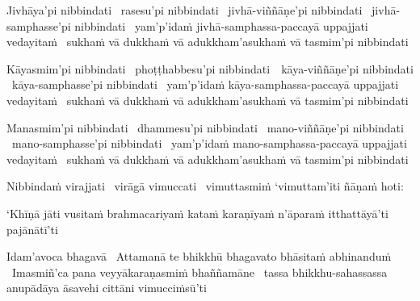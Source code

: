 \ifbfive\clearpage\fi

\begin{pali-hang}
  Jivhāya'pi nibbindati \breathmark\ rasesu'pi nibbindati \breathmark\ jivhā-viññāṇe'pi nibbindati \breathmark\ jivhā-samphasse'pi nibbindati \breathmark\ yam'p'idaṁ jivhā-samphassa-paccayā uppajjati vedayitaṁ \breathmark\ sukhaṁ vā dukkhaṁ vā adukkham'asukhaṁ vā tasmim'pi nibbindati
\end{pali-hang}

\ifafive\clearpage\fi

\begin{pali-hang}
  Kāyasmim'pi nibbindati \breathmark\ phoṭṭhabbesu'pi \mbox{nibbindati}~\breathmark\ kāya-viññāṇe'pi nibbindati \breathmark\ kāya-samphasse'pi nibbindati \breathmark\ yam'p'idaṁ kāya-samphassa-paccayā uppajjati vedayitaṁ \breathmark\ sukhaṁ vā dukkhaṁ vā adukkham'asukhaṁ vā tasmim'pi nibbindati
\end{pali-hang}

\begin{pali-hang}
  Manasmim'pi nibbindati \breathmark\ dhammesu'pi nibbindati \breathmark\ mano-viññāṇe'pi nibbindati \breathmark\ mano-samphasse'pi nibbindati \breathmark\ yam'p'idaṁ mano-samphassa-paccayā uppajjati vedayitaṁ \breathmark\ sukhaṁ vā dukkhaṁ vā adukkham'asukhaṁ vā tasmim'pi nibbindati
\end{pali-hang}

\begin{pali-hang}
  Nibbindaṁ virajjati \breathmark\ virāgā vimuccati \breathmark\ vimuttasmiṁ `vimuttam'iti ñāṇaṁ hoti:
\end{pali-hang}

\begin{pali-hang}
  `Khīṇā jāti vusitaṁ brahmacariyaṁ kataṁ karaṇīyaṁ n'āparaṁ itthattāyā'ti pajānātī'ti
\end{pali-hang}

\begin{pali-hang}
  Idam'avoca bhagavā \breathmark\ Attamanā te bhikkhū bhagavato bhāsitaṁ abhinanduṁ \breathmark\ Imasmiñ'ca pana veyyākaraṇasmiṁ bhaññamāne \breathmark\ tassa bhikkhu-sahassassa anupādāya āsavehi cittāni vimucciṁsū'ti
\end{pali-hang}

\suttaRef{[SN 35.28]}

\ifdigital{}\fi

